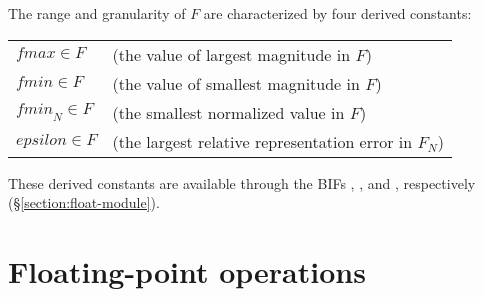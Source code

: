 
The range and granularity of $F$ are characterized by four derived
constants:
\begin{textdisplay}
\begin{tabular}{@{}ll@{}}
$\mathit{fmax}\in F$ & (the value of largest magnitude in $F$) \\
$\mathit{fmin}\in F$ & (the value of smallest magnitude in $F$) \\
$\mathit{fmin}_N\in F$ & (the smallest normalized value in $F$) \\
$\mathit{epsilon}\in F$ & (the largest relative representation error in $F_N$)
\end{tabular}
\end{textdisplay}

\iffalse
\ifOld
For \OldErlang,
$\mathit{fmax}$ is XXX,
$\mathit{fmin}$ is XXX,
$\mathit{fmin}_N$ is XXX and
$\mathit{epsilon}$ is XXX.
\fi\fi

These derived constants are available through the BIFs
, ,
 and
, respectively (\S\ref{section:float-module}).
\fi
{}

\section{Floating-point operations}

\label{section:float-operations}

